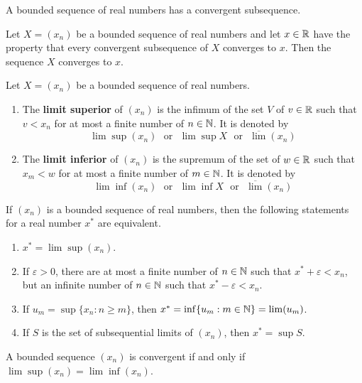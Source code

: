 \begin{theorem}
	A bounded sequence of real numbers has a convergent subsequence.
\end{theorem}

\begin{theorem}
	Let $X=(x_n)$ be a bounded sequence of real numbers and let $x \in \mathbb{R}$ have the property that every convergent subsequence of $X$ converges to $x$. Then the sequence $X$ converges to $x$.
\end{theorem}

\begin{definition}
	Let $X=(x_n)$ be a bounded sequence of real numbers.
	\begin{enumerate}
		\item The \textbf{limit superior} of $(x_n)$ is the infimum of the set $V$ of $v \in \mathbb{R}$ such that $v < x_n$ for at most a finite number of $n \in \mathbb{N}$. It is denoted by
		      \[\lim \sup (x_n)\ \ \ \text{or}\ \ \ \lim \sup X\ \ \ \text{or}\ \ \ \overline{\lim} (x_n)\]

		\item The \textbf{limit inferior} of $(x_n)$ is the supremum of the set of $w \in \mathbb{R}$ such that $x_m < w$ for at most a finite number of $m \in \mathbb{N}$. It is denoted by
		      \[\lim \inf (x_n)\ \ \ \text{or}\ \ \ \lim \inf X\ \ \ \text{or}\ \ \ \overline{\lim}(x_n)\]
	\end{enumerate}
\end{definition}

\begin{theorem}
	If $(x_n)$ is a bounded sequence of real numbers, then the following statements for a real number $x^*$ are equivalent.
	\begin{enumerate}
		\item $x^* = \lim \sup (x_n)$.

		\item If $\varepsilon>0$, there are at most a finite number of $n \in \mathbb{N}$ such that $x^* + \varepsilon < x_n$, but an infinite number of $n \in \mathbb{N}$ such that $x^*-\varepsilon < x_n$.

		\item If $u_m=\sup \{x_n : n \geq m \}$, then $x^*= \inf \{u_m : m \in \mathbb{N}\}= \lim(u_m)$.

		\item If $S$ is the set of subsequential limits of $(x_n)$, then $x^*= \sup S$.
	\end{enumerate}
\end{theorem}

\begin{theorem}
	A bounded sequence $(x_n)$ is convergent if and only if $\lim \sup (x_n)=\lim \inf (x_n)$.
\end{theorem}
